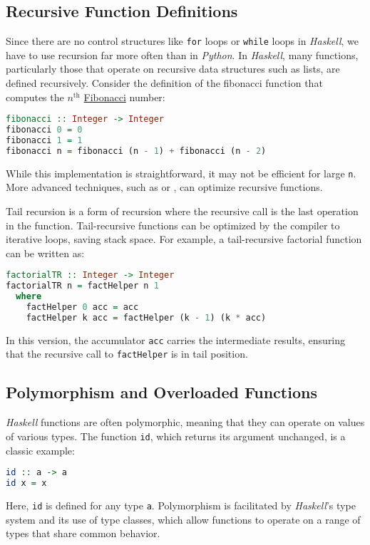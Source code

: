\subsection{Recursive Function Definitions}
Since there are no control structures like \texttt{for} loops or \texttt{while} loops in \textsl{Haskell}, we
have to use recursion far more often than in \textsl{Python}.
In \textsl{Haskell}, many functions, particularly those that operate on recursive data structures such as
lists, are defined recursively.  Consider the definition of the fibonacci function that computes the $n^{\textrm{th}}$
\href{https://en.wikipedia.org/wiki/Fibonacci_sequence}{Fibonacci} number: 
\begin{lstlisting}[style=haskellstyle, language=Haskell]
fibonacci :: Integer -> Integer
fibonacci 0 = 0
fibonacci 1 = 1
fibonacci n = fibonacci (n - 1) + fibonacci (n - 2)
\end{lstlisting}
While this implementation is straightforward, it may not be efficient for large \texttt{n}. More advanced
techniques, such as  or , can optimize recursive functions. 

Tail recursion is a form of recursion where the recursive call is the last operation in the function. Tail-recursive functions can be optimized by the compiler to iterative loops, saving stack space. For example, a tail-recursive factorial function can be written as:
\begin{lstlisting}[style=haskellstyle, language=Haskell]
factorialTR :: Integer -> Integer
factorialTR n = factHelper n 1
  where
    factHelper 0 acc = acc
    factHelper k acc = factHelper (k - 1) (k * acc)
\end{lstlisting}
In this version, the accumulator \texttt{acc} carries the intermediate results, ensuring that the recursive call to \texttt{factHelper} is in tail position.

\subsection{Polymorphism and Overloaded Functions}

\textsl{Haskell} functions are often polymorphic, meaning that they can operate on values of various types. The function \texttt{id}, which returns its argument unchanged, is a classic example:
\begin{lstlisting}[style=haskellstyle, language=Haskell]
id :: a -> a
id x = x
\end{lstlisting}
Here, \texttt{id} is defined for any type \texttt{a}. Polymorphism is facilitated by \textsl{Haskell}’s type system and its use of type classes, which allow functions to operate on a range of types that share common behavior.

